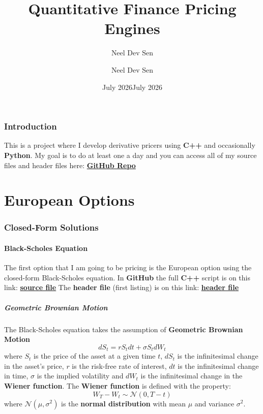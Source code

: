 \documentclass[12pt]{article}
\title{
	Quantitative Finance Pricing Engines\\[0.0em]
}
\author{Neel Dev Sen}
\date{July 2026}
\author{Neel Dev Sen}
\date{July 2026}
\numberwithin{equation}{section}
\begin{document}
	
	\maketitle
	\newpage
	\tableofcontents
	\newpage

\newpage
\setcounter{section}{0}
\section*{Introduction}
This is a project where I develop derivative pricers using \textbf{C++} and occasionally \textbf{Python}. My goal is to do at least one a day and you can access all of my source files and header files here:  \href{https://github.com/neeldevsen/one-pricer-a-day}{\textbf{GitHub Repo}}
\newpage
\part{European Options} \newpage
\section{Closed-Form Solutions}
\subsection{Black-Scholes Equation}
The first option that I am going to be pricing is the European option using the closed-form Black-Scholes equation. \newline \newline In \textbf{GitHub} the full \textbf{C++} script is on this link:
\href{https://github.com/neeldevsen/one-pricer-a-day/blob/main/day1-BlackScholes.cpp}{\textbf{source file}} \newline
The \textbf{header file} (first listing) is on this link:
\href{https://github.com/neeldevsen/one-pricer-a-day/blob/main/functions.hpp}{\textbf{header file}}
\subsubsection{Geometric Brownian Motion}
The Black-Scholes equation takes the assumption of \textbf{Geometric Brownian Motion}
\begin{equation}
	dS_t = rS_tdt + \sigma S_t dW_t
	\label{risk-neutral}
\end{equation} \cite{shreve2004}
   \newline where $S_t$ is the price of the asset at a given time $t$, $dS_t$ is the infinitesimal change in the asset's price, $r$ is the risk-free rate of interest, $dt$ is the infinitesimal change in time, $\sigma$ is the implied volatility and $dW_t$ is the infinitesimal change in the \textbf{Wiener	function}. The \textbf{Wiener function} is defined with the property:
\begin{equation}
	W_T - W_t \sim \mathcal{N}(0,T-t)
	\label{wiener}
\end{equation}
where $\mathcal{N(\mu, \sigma^2)}$ is the \textbf{normal distribution} with mean $\mu$ and variance $\sigma^2$.\cite{lalleyBrownian} \newline \newline
\end{document}
